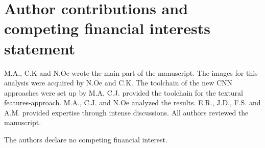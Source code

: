\documentclass[fleqn,10pt]{wlscirep}
\begin{document}
\section*{Author contributions and competing financial interests statement}

M.A., C.K and N.Oe wrote the main part of the manuscript. 
The images for this analysis were acquired by N.Oe and C.K.
The toolchain of the new CNN approaches were set up by M.A. 
C.J. provided the toolchain for the textural features-approach. 
M.A., C.J. and N.Oe analyzed the results.
E.R., J.D., F.S. and A.M. provided expertise through intense discussions.
All authors reviewed the manuscript.

The authors declare no competing financial interest.
\end{document}
